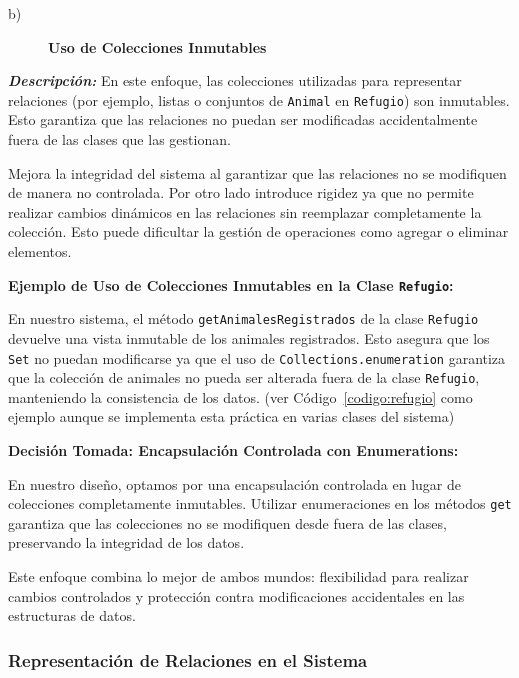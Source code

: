 \begin{description}
    \item[b)] \textbf{Uso de Colecciones Inmutables}
\end{description}

\textit{\textbf{Descripción:}}  
En este enfoque, las colecciones utilizadas para representar relaciones (por ejemplo, 
listas o conjuntos de \texttt{Animal} en \texttt{Refugio}) son inmutables. Esto garantiza 
que las relaciones no puedan ser modificadas accidentalmente fuera de las clases que las 
gestionan.
\vspace{0.15cm}

    Mejora la integridad del sistema al garantizar que las relaciones no se modifiquen de 
    manera no controlada.
    Por otro lado introduce rigidez ya que no permite realizar cambios dinámicos en las relaciones sin 
    reemplazar completamente la colección. Esto puede dificultar la gestión de operaciones 
    como agregar o eliminar elementos.\par
    \vspace{0.15cm}

\textbf{Ejemplo de Uso de Colecciones Inmutables en la Clase \texttt{Refugio}:}\par  
En nuestro sistema, el método \texttt{getAnimalesRegistrados} de la clase \texttt{Refugio} 
devuelve una vista inmutable de los animales registrados. Esto asegura que los \texttt{Set} no 
puedan modificarse ya que el uso de \texttt{Collections.}\texttt{enumeration} 
garantiza que la colección de animales no pueda ser alterada fuera de la clase \texttt{Refugio}, 
manteniendo la consistencia de los datos. (ver Código~\ref{codigo:refugio} como ejemplo aunque se implementa esta práctica en varias clases del sistema)

\textbf{Decisión Tomada: Encapsulación Controlada con Enumerations:}\par
En nuestro diseño, optamos por una encapsulación controlada en lugar de colecciones 
completamente inmutables. Utilizar enumeraciones en los métodos \texttt{get} garantiza que las colecciones 
no se modifiquen desde fuera de las clases, preservando la integridad de los datos.

Este enfoque combina lo mejor de ambos mundos: flexibilidad para realizar cambios controlados 
y protección contra modificaciones accidentales en las estructuras de datos.

\subsubsection{Representación de Relaciones en el Sistema}

